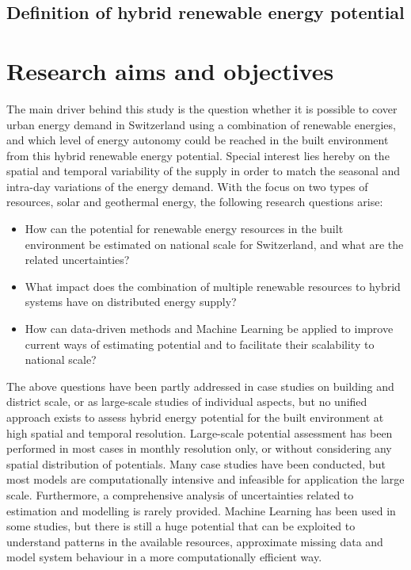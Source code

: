 \subsection{Definition of hybrid renewable energy potential}

\section{Research aims and objectives}
\label{intro_goals}



The main driver behind this study is the question whether it is possible to cover urban energy demand in Switzerland using a combination of renewable energies, and which level of energy autonomy could be reached in the built environment from this hybrid renewable energy potential. Special interest lies hereby on the spatial and temporal variability of the supply in order to match the seasonal and intra-day variations of the energy demand. With the focus on two types of resources, solar and geothermal energy, the following research questions arise:

\begin{itemize}
\item How can the potential for renewable energy resources in the built environment be estimated on national scale for Switzerland, and what are the related uncertainties?
\item What impact does the combination of multiple renewable resources to hybrid systems have on distributed energy supply?
\item How can data-driven methods and Machine Learning be applied to improve current ways of estimating potential and to facilitate their scalability to national scale?
\end{itemize}

The above questions have been partly addressed in case studies on building and district scale, or as large-scale studies of individual aspects, but no unified approach exists to assess hybrid energy potential for the built environment at high spatial and temporal resolution. Large-scale potential assessment has been performed in most cases in monthly resolution only, or without considering any spatial distribution of potentials. Many case studies have been conducted, but most models are computationally intensive and infeasible for application the large scale. Furthermore, a comprehensive analysis of uncertainties related to estimation and modelling is rarely provided. Machine Learning has been used in some studies, but there is still a huge potential that can be exploited to understand patterns in the available resources, approximate missing data and model system behaviour in a more computationally efficient way.


